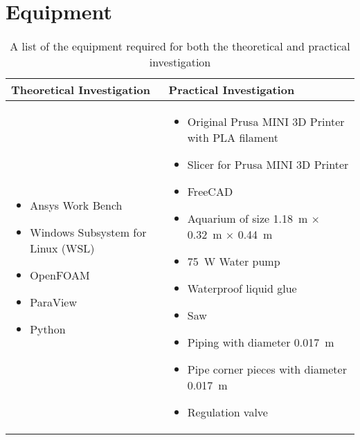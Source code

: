 \section{Equipment}
\begin{table}[H]
	\centering
	\begin{tabularx}{\textwidth}{|X|X|}
		\hline
		\textbf{Theoretical Investigation} & \textbf{Practical Investigation} \\
		\hline
		\begin{itemize}[leftmargin=1.5em, itemsep=2pt, topsep=0pt, label=--]
			\item Ansys Work Bench \parencite{noauthor_ansys_nodate}
			\item Windows Subsystem for Linux (WSL) \parencite{noauthor_windows_nodate}
			\item OpenFOAM \parencite{noauthor_openfoam_2024}
			\item ParaView \parencite{noauthor_paraview_nodate}
			\item Python \parencite{noauthor_python_2025}
		\end{itemize} 
		&
		\begin{itemize}[leftmargin=1.5em, itemsep=2pt, topsep=0pt, label=--]
			\item Original Prusa MINI 3D Printer with PLA filament \parencite{noauthor_prusa_nodate}
			\item Slicer for Prusa MINI 3D Printer \parencite{noauthor_prusaslicer_nodate}
			\item FreeCAD \parencite{noauthor_freecad_nodate}
			\item Aquarium of size \SI{1.18}{\meter} $\times$ \SI{0.32}{\meter} $\times$ \SI{0.44}{\meter}
			\item \SI{75}{\watt} Water pump \parencite{noauthor_lnicez_nodate}
			\item Waterproof liquid glue
			\item Saw
			\item Piping with diameter \diameter\SI{0.017}{\meter}
			\item Pipe corner pieces with diameter \diameter\SI{0.017}{\meter}
			\item Regulation valve
		\end{itemize} \\
		\hline
	\end{tabularx}
	\caption{A list of the equipment required for both the theoretical and practical investigation}
	\label{tab:equipmentList1}
\end{table}

